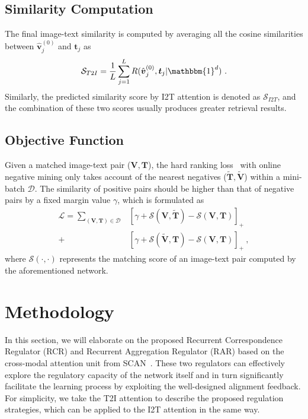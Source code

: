 \documentclass[journal]{IEEEtran}\newcommand{\ignore}[1]{}
\begin{document}
\subsection{Similarity Computation}
The final image-text similarity is computed by averaging all the cosine similarities between $\hat{\boldsymbol{v}}_{j}^{(0)}$ and $\boldsymbol{t}_{j}$ as
\begin{equation}
\label{eq:st2i}
    \mathcal{S}_{T2I} = \frac{1}{L}\sum_{j=1}^{L} R(\hat{\boldsymbol{v}}_{j}^{(0)}, \boldsymbol{t}_{j} |\mathbbm{1}^{d}) \ .
\end{equation} 
Similarly, the predicted similarity score by I2T attention is denoted as $\mathcal{S}_{I2T}$, and the combination of these two scores usually produces greater retrieval results. 

\subsection{Objective Function}
Given a matched image-text pair ($\boldsymbol{V},\boldsymbol{T}$), the hard ranking loss~\cite{VSE++} with online negative mining only takes account of the nearest negatives ($\tilde{\boldsymbol{T}}, \tilde{\boldsymbol{V}}$) within a mini-batch $\mathcal{D}$. The similarity of positive pairs should be higher than that of negative pairs by a fixed margin value $\gamma$, which is formulated as
\begin{equation}
\label{eq:losfun}
\begin{split}
\mathcal{L} = \sum_{(\boldsymbol{V}, \boldsymbol{T})\in\mathcal{D}}
&[\gamma + \mathcal{S}(\boldsymbol{V}, \tilde{\boldsymbol{T}}) - \mathcal{S}(\boldsymbol{V}, \boldsymbol{T})]_{+} \\
+\ &[\gamma + \mathcal{S}(\tilde{\boldsymbol{V}}, \boldsymbol{T}) - \mathcal{S}(\boldsymbol{V}, \boldsymbol{T})]_{+} \ ,
\end{split}
\end{equation}
where $\mathcal{S}(\cdot,\cdot)$ represents the matching score of an image-text pair computed by the aforementioned network. 


\section{Methodology}
In this section, we will elaborate on the proposed Recurrent Correspondence Regulator (RCR) and Recurrent Aggregation Regulator (RAR) based on the cross-modal attention unit from SCAN~\cite{SCAN}. 
These two regulators can effectively explore the regulatory capacity of the network itself and in turn significantly facilitate the learning process by exploiting the well-designed alignment feedback. 
For simplicity, we take the T2I attention to describe the proposed regulation strategies, which can be applied to the I2T attention in the same way.
\end{document}

